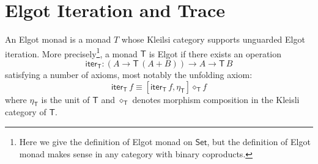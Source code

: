 \documentclass[runningheads]{llncs}
\newcommand{\Pio}{$\mathsf{\Pi}^{\mathsf{o}}$}
\newcommand{\Set}{\mathsf{Set}}
\newcommand{\copair}[2]{[#1,#2]}
\newcommand{\T}{\mathsf{T}}
\newcommand{\iter}{\mathsf{iter}}
\newcommand{\Delay}{\mathsf{Delay}\,}
\begin{document}


\section{Elgot Iteration and Trace}\label{sec:elgot}

An Elgot monad is a monad $T$ whose Kleilsi category supports
unguarded Elgot iteration. More precisely\footnote{Here we give the
  definition of Elgot monad on $\Set$, but the definition of Elgot
  monad makes sense in any category with binary coproducts.}, a monad
$\T$ is Elgot if there exists an operation
\[
\iter_\T : (A \to \T \,(A + B)) \to A \to \T\,B
\]
satisfying a number of axioms, most notably the unfolding axiom:
\[
\iter_\T\,f \equiv \copair{\iter_\T \,f}{\eta_\T} \diamond_\T f
\]
where $\eta_\T$ is the unit of $\T$ and $\diamond_\T$ denotes morphism
composition in the Kleisli category of $\T$.
\end{document}
